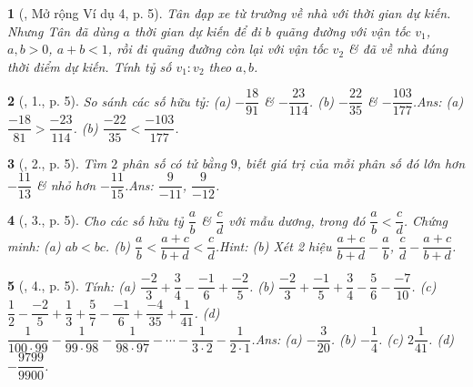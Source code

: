 \documentclass{article}
\newtheorem{baitoan}{}
\begin{document}
\begin{baitoan}[\cite{Binh_Toan_7_tap_1}, Mở rộng Ví dụ 4, p. 5]
	Tân đạp xe từ trường về nhà với thời gian dự kiến. Nhưng Tân đã dùng $a$ thời gian dự kiến để đi $b$ quãng đường với vận tốc $v_1$, $a,b > 0$, $a + b < 1$, rồi đi quãng đường còn lại với vận tốc $v_2$ \& đã về nhà đúng thời điểm dự kiến. Tính tỷ số $v_1:v_2$ theo $a,b$.
\end{baitoan}

\begin{baitoan}[\cite{Binh_Toan_7_tap_1}, 1., p. 5]
	So sánh các số hữu tỷ: (a) $-\dfrac{18}{91}$ \& $-\dfrac{23}{114}$. (b) $-\dfrac{22}{35}$ \& $-\dfrac{103}{177}$.\hfill{\sf Ans: (a) $\dfrac{-18}{81} > \dfrac{-23}{114}$. (b) $\dfrac{-22}{35} < \dfrac{-103}{177}$.}
\end{baitoan}

\begin{baitoan}[\cite{Binh_Toan_7_tap_1}, 2., p. 5]
	Tìm $2$ phân số có tử bằng $9$, biết giá trị của mỗi phân số đó lớn hơn $-\dfrac{11}{13}$ \& nhỏ hơn $-\dfrac{11}{15}$.\hfill{\sf Ans: $\dfrac{9}{-11}$, $\dfrac{9}{-12}$.}
\end{baitoan}

\begin{baitoan}[\cite{Binh_Toan_7_tap_1}, 3., p. 5]
	Cho các số hữu tỷ $\dfrac{a}{b}$ \& $\dfrac{c}{d}$ với mẫu dương, trong đó $\dfrac{a}{b} < \dfrac{c}{d}$. Chứng minh: (a) $ab < bc$. (b) $\dfrac{a}{b} < \dfrac{a + c}{b + d} < \dfrac{c}{d}$.\hfill{\sf Hint: (b) Xét 2 hiệu $\dfrac{a + c}{b + d} - \dfrac{a}{b}$, $\dfrac{c}{d} - \dfrac{a + c}{b + d}$.}
\end{baitoan}

\begin{baitoan}[\cite{Binh_Toan_7_tap_1}, 4., p. 5]
	Tính: (a) $\dfrac{-2}{3} + \dfrac{3}{4} - \dfrac{-1}{6} + \dfrac{-2}{5}$. (b) $\dfrac{-2}{3} + \dfrac{-1}{5} + \dfrac{3}{4} - \dfrac{5}{6} - \dfrac{-7}{10}$. (c) $\dfrac{1}{2} - \dfrac{-2}{5} + \dfrac{1}{3} + \dfrac{5}{7} - \dfrac{-1}{6} + \dfrac{-4}{35} + \dfrac{1}{41}$. (d) $\dfrac{1}{100\cdot 99} - \dfrac{1}{99\cdot 98} - \dfrac{1}{98\cdot 97} - \cdots - \dfrac{1}{3\cdot 2} - \dfrac{1}{2\cdot 1}$.\hfill{\sf Ans: (a) $-\dfrac{3}{20}$. (b) $-\dfrac{1}{4}$. (c) $2\dfrac{1}{41}$. (d) $-\dfrac{9799}{9900}$.}
\end{baitoan}
\end{document}
